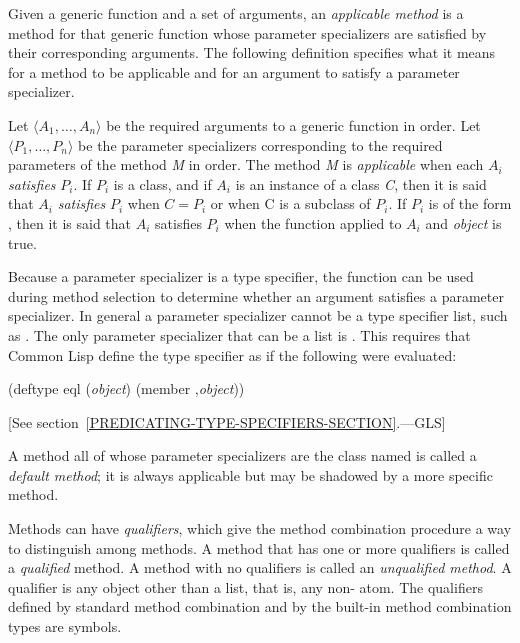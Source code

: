 Given a generic function and a set of arguments, an \emph{applicable
method\/} is a method for that generic function whose parameter
specializers are satisfied by their corresponding arguments.  The
following definition specifies what it means for a method to be
applicable and for an argument to satisfy a parameter specializer.

Let $\langle A_1, \ldots, A_{n}\rangle$ be the required
arguments to a generic function in order. Let $\langle P_1,
\ldots, P_{n}\rangle$ be the parameter specializers corresponding to
the required parameters of the method \emph{M} in order.  The method \emph{M} is
\emph{applicable\/} when each $A_{i}$
\emph{satisfies\/} $P_{i}$.
If $P_{i}$ is a class,
and if $A_{i}$ is an instance of a class
\emph{C}, then it is said that $A_{i}$ \emph{satisfies\/}
$P_{i}$ when $C=P_{i}$ or when C is a subclass of $P_{i}$.  If
$P_{i}$ is of the form
, then it is said that
$A_{i}$ satisfies $P_{i}$
when the function  applied to
$A_{i}$ and \emph{object} is true.

Because a parameter specializer is a type specifier, the function 
 can be used during method selection to determine whether an
argument satisfies a parameter specializer.  In general a
parameter specializer cannot be a type specifier list, such as 
.  The only parameter specializer that can
be a list is .  This requires that
Common Lisp define the type specifier 
as if the following were evaluated:

\begin{lisp}
(deftype eql (\emph{object\/}) {\Xbq}(member ,\emph{object\/}))
\end{lisp}
[See section~\ref{PREDICATING-TYPE-SPECIFIERS-SECTION}.---GLS]

A method all of whose parameter specializers are the class named 
 is called a \emph{default method}; it is always applicable but
may be shadowed by a more specific method.

Methods can have \emph{qualifiers}, which give the method combination
procedure a way to distinguish among methods.  A method that has one
or more qualifiers is called a \emph{qualified\/} method.
A method with no qualifiers is called an \emph{unqualified method}. 
A qualifier is any object other than a list, that is,
any non- atom.  The qualifiers defined by standard method combination
and by the built-in method combination types are symbols.


